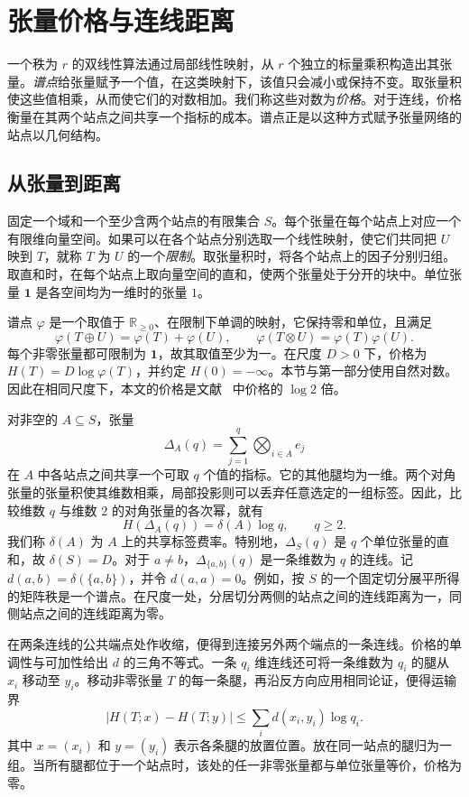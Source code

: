 \section{张量价格与连线距离}\label{sec:prices-background}

一个秩为 \(r\) 的双线性算法通过局部线性映射，从 \(r\) 个独立的标量乘积构造出其张量。\emph{谱点}给张量赋予一个值，在这类映射下，该值只会减小或保持不变。取张量积使这些值相乘，从而使它们的对数相加。我们称这些对数为\emph{价格}。对于连线，价格衡量在其两个站点之间共享一个指标的成本。谱点正是以这种方式赋予张量网络的站点以几何结构。

\subsection{从张量到距离}

固定一个域和一个至少含两个站点的有限集合 \(S\)。每个张量在每个站点上对应一个有限维向量空间。如果可以在各个站点分别选取一个线性映射，使它们共同把 \(U\) 映到 \(T\)，就称 \(T\) 为 \(U\) 的一个\emph{限制}。取张量积时，将各个站点上的因子分别归组。取直和时，在每个站点上取向量空间的直和，使两个张量处于分开的块中。单位张量 \(\mathbf 1\) 是各空间均为一维时的张量 \(1\)。

谱点 \(\varphi\) 是一个取值于 \(\mathbb R_{\ge0}\)、在限制下单调的映射，它保持零和单位，且满足
\[
     \varphi(T\oplus U)=\varphi(T)+\varphi(U),\qquad
     \varphi(T\otimes U)=\varphi(T)\varphi(U).
\]
每个非零张量都可限制为 \(\mathbf 1\)，故其取值至少为一。在尺度 \(D>0\) 下，价格为 \(H(T)=D\log\varphi(T)\)，并约定 \(H(0)=-\infty\)。本节与第一部分使用自然对数。因此在相同尺度下，本文的价格是文献~\cite{oaG} 中价格的 \(\log 2\) 倍。

对非空的 \(A\subseteq S\)，张量
\[
         \Delta_A(q)=\sum_{j=1}^q\bigotimes_{i\in A} e_j
\]
在 \(A\) 中各站点之间共享一个可取 \(q\) 个值的指标。它的其他腿均为一维。两个对角张量的张量积使其维数相乘，局部投影则可以丢弃任意选定的一组标签。因此，比较维数 \(q\) 与维数 \(2\) 的对角张量的各次幂，就有
\[
            H(\Delta_A(q))=\delta(A)\log q,\qquad q\ge2.
\]
我们称 \(\delta(A)\) 为 \(A\) 上的共享标签费率。特别地，\(\Delta_S(q)\) 是 \(q\) 个单位张量的直和，故 \(\delta(S)=D\)。对于 \(a\ne b\)，\(\Delta_{\{a,b\}}(q)\) 是一条维数为 \(q\) 的连线。记 \(d(a,b)=\delta(\{a,b\})\)，并令 \(d(a,a)=0\)。例如，按 \(S\) 的一个固定切分展平所得的矩阵秩是一个谱点。在尺度一处，分居切分两侧的站点之间的连线距离为一，同侧站点之间的连线距离为零。

在两条连线的公共端点处作收缩，便得到连接另外两个端点的一条连线。价格的单调性与可加性给出 \(d\) 的三角不等式。一条 \(q_i\) 维连线还可将一条维数为 \(q_i\) 的腿从 \(x_i\) 移动至 \(y_i\)。移动非零张量 \(T\) 的每一条腿，再沿反方向应用相同论证，便得运输界
\begin{equation}\label{eq:prices-transport}
       |H(T;x)-H(T;y)|\le\sum_i d(x_i,y_i)\log q_i .
\end{equation}
其中 \(x=(x_i)\) 和 \(y=(y_i)\) 表示各条腿的放置位置。放在同一站点的腿归为一组。当所有腿都位于一个站点时，该处的任一非零张量都与单位张量等价，价格为零。

